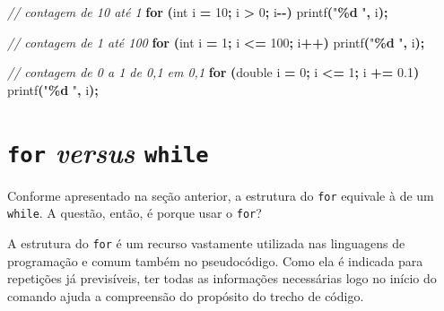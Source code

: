 \documentclass[
  11pt,
  a4paper,
]{scrbook}
\newenvironment{Shaded}{\begin{snugshade}}{\end{snugshade}}
\newcommand{\CommentTok}[1]{\textcolor[rgb]{0.56,0.35,0.01}{\textit{#1}}}
\newcommand{\ControlFlowTok}[1]{\textcolor[rgb]{0.13,0.29,0.53}{\textbf{#1}}}
\newcommand{\DataTypeTok}[1]{\textcolor[rgb]{0.13,0.29,0.53}{#1}}
\newcommand{\DecValTok}[1]{\textcolor[rgb]{0.00,0.00,0.81}{#1}}
\newcommand{\FloatTok}[1]{\textcolor[rgb]{0.00,0.00,0.81}{#1}}
\newcommand{\NormalTok}[1]{#1}
\newcommand{\OperatorTok}[1]{\textcolor[rgb]{0.81,0.36,0.00}{\textbf{#1}}}
\newcommand{\SpecialCharTok}[1]{\textcolor[rgb]{0.81,0.36,0.00}{\textbf{#1}}}
\newcommand{\StringTok}[1]{\textcolor[rgb]{0.31,0.60,0.02}{#1}}
\begin{document}
\begin{Shaded}
\begin{Highlighting}[]
\CommentTok{// contagem de 10 até 1}
\ControlFlowTok{for} \OperatorTok{(}\DataTypeTok{int}\NormalTok{ i }\OperatorTok{=} \DecValTok{10}\OperatorTok{;}\NormalTok{ i }\OperatorTok{\textgreater{}} \DecValTok{0}\OperatorTok{;}\NormalTok{ i}\OperatorTok{{-}{-})}
\NormalTok{    printf}\OperatorTok{(}\StringTok{"}\SpecialCharTok{\%d}\StringTok{ "}\OperatorTok{,}\NormalTok{ i}\OperatorTok{);}
\end{Highlighting}
\end{Shaded}

\begin{Shaded}
\begin{Highlighting}[]
\CommentTok{// contagem de 1 até 100}
\ControlFlowTok{for} \OperatorTok{(}\DataTypeTok{int}\NormalTok{ i }\OperatorTok{=} \DecValTok{1}\OperatorTok{;}\NormalTok{ i }\OperatorTok{\textless{}=} \DecValTok{100}\OperatorTok{;}\NormalTok{ i}\OperatorTok{++)}
\NormalTok{    printf}\OperatorTok{(}\StringTok{"}\SpecialCharTok{\%d}\StringTok{ "}\OperatorTok{,}\NormalTok{ i}\OperatorTok{);}
\end{Highlighting}
\end{Shaded}

\begin{Shaded}
\begin{Highlighting}[]
\CommentTok{// contagem de 0 a 1 de 0,1 em 0,1}
\ControlFlowTok{for} \OperatorTok{(}\DataTypeTok{double}\NormalTok{ i }\OperatorTok{=} \DecValTok{0}\OperatorTok{;}\NormalTok{ i }\OperatorTok{\textless{}=} \DecValTok{1}\OperatorTok{;}\NormalTok{ i }\OperatorTok{+=} \FloatTok{0.1}\OperatorTok{)}
\NormalTok{    printf}\OperatorTok{(}\StringTok{"}\SpecialCharTok{\%d}\StringTok{ "}\OperatorTok{,}\NormalTok{ i}\OperatorTok{);}
\end{Highlighting}
\end{Shaded}

\section{\texorpdfstring{\texttt{for} \emph{versus}
\texttt{while}}{for versus while}}\label{for-versus-while}

Conforme apresentado na seção anterior, a estrutura do \texttt{for}
equivale à de um \texttt{while}. A questão, então, é porque usar o
\texttt{for}?

A estrutura do \texttt{for} é um recurso vastamente utilizada nas
linguagens de programação e comum também no pseudocódigo. Como ela é
indicada para repetições já previsíveis, ter todas as informações
necessárias logo no início do comando ajuda a compreensão do propósito
do trecho de código.
\end{document}
